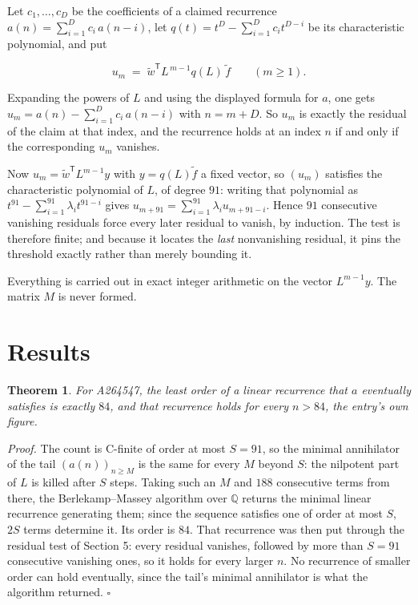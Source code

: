 \documentclass[11pt]{article}
\newtheorem{theorem}{Theorem}
\theoremstyle{definition}
\begin{document}
Let $c_1,\dots,c_D$ be the coefficients of a claimed recurrence $a(n) = \sum_{i=1}^{D} c_i\,a(n-i)$, let $q(t) = t^{D} - \sum_{i=1}^{D} c_i t^{D-i}$ be its characteristic polynomial, and put

\[u_m \;=\; \tilde w^{\mathsf T} L^{\,m-1} q(L)\,\tilde f \qquad (m \ge 1).\]

Expanding the powers of $L$ and using the displayed formula for $a$, one gets $u_m = a(n) - \sum_{i=1}^{D} c_i\,a(n-i)$ with $n = m + D$. So $u_m$ is exactly the residual of the claim at that index, and the recurrence holds at an index $n$ if and only if the corresponding $u_m$ vanishes.

Now $u_m = \tilde w^{\mathsf T} L^{m-1} y$ with $y = q(L)\tilde f$ a fixed vector, so $(u_m)$ satisfies the characteristic polynomial of $L$, of degree $91$: writing that polynomial as $t^{91} - \sum_{i=1}^{91} \lambda_i t^{91-i}$ gives $u_{m+91} = \sum_{i=1}^{91} \lambda_i u_{m+91-i}$. Hence $91$ consecutive vanishing residuals force every later residual to vanish, by induction. The test is therefore finite; and because it locates the {\itshape last} nonvanishing residual, it pins the threshold exactly rather than merely bounding it.

Everything is carried out in exact integer arithmetic on the vector $L^{m-1}y$. The matrix $M$ is never formed.

\section{Results}

\begin{theorem} For A264547, the least order of a linear recurrence that $a$ eventually satisfies is exactly $84$, and that recurrence holds for every $n > 84$, the entry's own figure.\end{theorem}

{\itshape Proof.} The count is C-finite of order at most $S = 91$, so the minimal annihilator of the tail $(a(n))_{n \ge M}$ is the same for every $M$ beyond $S$: the nilpotent part of $L$ is killed after $S$ steps. Taking such an $M$ and $188$ consecutive terms from there, the Berlekamp--Massey algorithm over $\mathbb{Q}$ returns the minimal linear recurrence generating them; since the sequence satisfies one of order at most $S$, $2S$ terms determine it. Its order is $84$. That recurrence was then put through the residual test of Section 5: every residual vanishes, followed by more than $S = 91$ consecutive vanishing ones, so it holds for every larger $n$. No recurrence of smaller order can hold eventually, since the tail's minimal annihilator is what the algorithm returned. $\square$
\end{document}
